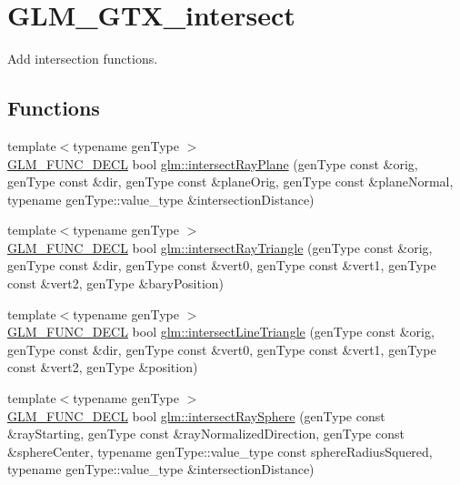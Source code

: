 \hypertarget{group__gtx__intersect}{}\section{G\+L\+M\+\_\+\+G\+T\+X\+\_\+intersect}
\label{group__gtx__intersect}


Add intersection functions.  


\subsection*{Functions}
\begin{DoxyCompactItemize}
\item 
{\footnotesize template$<$typename gen\+Type $>$ }\\\mbox{\hyperlink{setup_8hpp_ab2d052de21a70539923e9bcbf6e83a51}{G\+L\+M\+\_\+\+F\+U\+N\+C\+\_\+\+D\+E\+CL}} bool \mbox{\hyperlink{group__gtx__intersect_gad3697a9700ea379739a667ea02573488}{glm\+::intersect\+Ray\+Plane}} (gen\+Type const \&orig, gen\+Type const \&dir, gen\+Type const \&plane\+Orig, gen\+Type const \&plane\+Normal, typename gen\+Type\+::value\+\_\+type \&intersection\+Distance)
\item 
{\footnotesize template$<$typename gen\+Type $>$ }\\\mbox{\hyperlink{setup_8hpp_ab2d052de21a70539923e9bcbf6e83a51}{G\+L\+M\+\_\+\+F\+U\+N\+C\+\_\+\+D\+E\+CL}} bool \mbox{\hyperlink{group__gtx__intersect_gab16c1b47c10451e7604b51b39a7ef21d}{glm\+::intersect\+Ray\+Triangle}} (gen\+Type const \&orig, gen\+Type const \&dir, gen\+Type const \&vert0, gen\+Type const \&vert1, gen\+Type const \&vert2, gen\+Type \&bary\+Position)
\item 
{\footnotesize template$<$typename gen\+Type $>$ }\\\mbox{\hyperlink{setup_8hpp_ab2d052de21a70539923e9bcbf6e83a51}{G\+L\+M\+\_\+\+F\+U\+N\+C\+\_\+\+D\+E\+CL}} bool \mbox{\hyperlink{group__gtx__intersect_ga9d29b9b3acb504d43986502f42740df4}{glm\+::intersect\+Line\+Triangle}} (gen\+Type const \&orig, gen\+Type const \&dir, gen\+Type const \&vert0, gen\+Type const \&vert1, gen\+Type const \&vert2, gen\+Type \&position)
\item 
{\footnotesize template$<$typename gen\+Type $>$ }\\\mbox{\hyperlink{setup_8hpp_ab2d052de21a70539923e9bcbf6e83a51}{G\+L\+M\+\_\+\+F\+U\+N\+C\+\_\+\+D\+E\+CL}} bool \mbox{\hyperlink{group__gtx__intersect_gac88f8cd84c4bcb5b947d56acbbcfa56e}{glm\+::intersect\+Ray\+Sphere}} (gen\+Type const \&ray\+Starting, gen\+Type const \&ray\+Normalized\+Direction, gen\+Type const \&sphere\+Center, typename gen\+Type\+::value\+\_\+type const sphere\+Radius\+Squered, typename gen\+Type\+::value\+\_\+type \&intersection\+Distance)

\end{DoxyCompactItemize}
